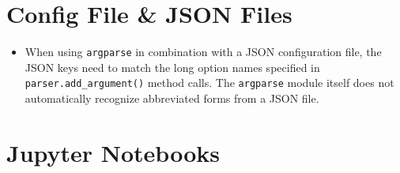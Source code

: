 \documentclass[12pt, a4paper]{scrbook}
\numberwithin{equation}{section}
\theoremstyle{definition}
\theoremstyle{definition}
\begin{document}
	\section{Config File \& JSON Files}
	
	\begin{itemize}
		\item  When using \texttt{argparse} in combination with a JSON configuration file, the JSON keys need to match the long option names specified in \texttt{parser.add\_argument()} method calls. The \texttt{argparse} module itself does not automatically recognize abbreviated forms from a JSON file.
	\end{itemize} 
	
	\section{Jupyter Notebooks}
	
\end{document}
